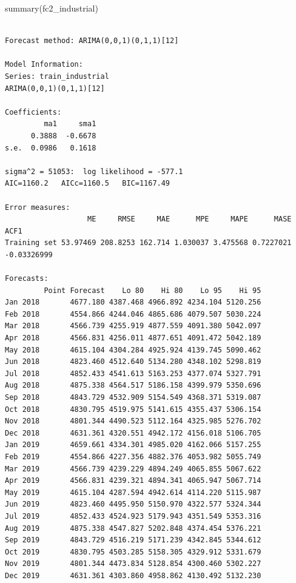 \documentclass[
  letterpaper,
  DIV=11,
  numbers=noendperiod]{scrartcl}
\newenvironment{Shaded}{\begin{snugshade}}{\end{snugshade}}
\newcommand{\FunctionTok}[1]{\textcolor[rgb]{0.28,0.35,0.67}{#1}}
\newcommand{\NormalTok}[1]{\textcolor[rgb]{0.00,0.23,0.31}{#1}}
\begin{document}
\begin{Shaded}
\begin{Highlighting}[]
\FunctionTok{summary}\NormalTok{(fc2\_industrial)}
\end{Highlighting}
\end{Shaded}

\begin{verbatim}

Forecast method: ARIMA(0,0,1)(0,1,1)[12]

Model Information:
Series: train_industrial 
ARIMA(0,0,1)(0,1,1)[12] 

Coefficients:
         ma1     sma1
      0.3888  -0.6678
s.e.  0.0986   0.1618

sigma^2 = 51053:  log likelihood = -577.1
AIC=1160.2   AICc=1160.5   BIC=1167.49

Error measures:
                   ME     RMSE     MAE      MPE     MAPE      MASE        ACF1
Training set 53.97469 208.8253 162.714 1.030037 3.475568 0.7227021 -0.03326999

Forecasts:
         Point Forecast    Lo 80    Hi 80    Lo 95    Hi 95
Jan 2018       4677.180 4387.468 4966.892 4234.104 5120.256
Feb 2018       4554.866 4244.046 4865.686 4079.507 5030.224
Mar 2018       4566.739 4255.919 4877.559 4091.380 5042.097
Apr 2018       4566.831 4256.011 4877.651 4091.472 5042.189
May 2018       4615.104 4304.284 4925.924 4139.745 5090.462
Jun 2018       4823.460 4512.640 5134.280 4348.102 5298.819
Jul 2018       4852.433 4541.613 5163.253 4377.074 5327.791
Aug 2018       4875.338 4564.517 5186.158 4399.979 5350.696
Sep 2018       4843.729 4532.909 5154.549 4368.371 5319.087
Oct 2018       4830.795 4519.975 5141.615 4355.437 5306.154
Nov 2018       4801.344 4490.523 5112.164 4325.985 5276.702
Dec 2018       4631.361 4320.551 4942.172 4156.018 5106.705
Jan 2019       4659.661 4334.301 4985.020 4162.066 5157.255
Feb 2019       4554.866 4227.356 4882.376 4053.982 5055.749
Mar 2019       4566.739 4239.229 4894.249 4065.855 5067.622
Apr 2019       4566.831 4239.321 4894.341 4065.947 5067.714
May 2019       4615.104 4287.594 4942.614 4114.220 5115.987
Jun 2019       4823.460 4495.950 5150.970 4322.577 5324.344
Jul 2019       4852.433 4524.923 5179.943 4351.549 5353.316
Aug 2019       4875.338 4547.827 5202.848 4374.454 5376.221
Sep 2019       4843.729 4516.219 5171.239 4342.845 5344.612
Oct 2019       4830.795 4503.285 5158.305 4329.912 5331.679
Nov 2019       4801.344 4473.834 5128.854 4300.460 5302.227
Dec 2019       4631.361 4303.860 4958.862 4130.492 5132.230
\end{verbatim}
\end{document}
